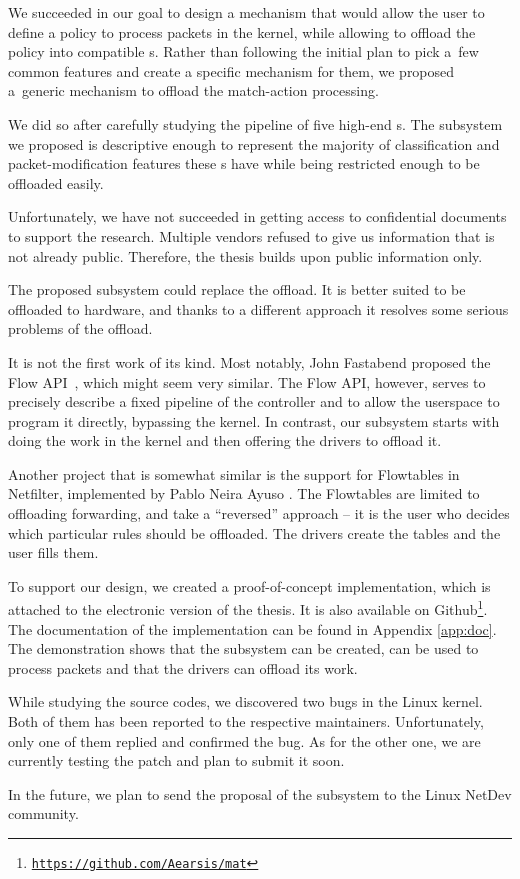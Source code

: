 
We succeeded in our goal to design a mechanism that would allow the user to
define a policy to process packets in the kernel, while allowing to offload the
policy into compatible s. Rather than following the initial plan to pick
a~few common features and create a specific mechanism for them, we
proposed a~generic mechanism to offload the match-action processing.

We did so after carefully studying the pipeline of five high-end s.
The subsystem we proposed is descriptive enough to represent the majority of
classification and packet-modification features these s have while
being restricted enough to be offloaded easily.

Unfortunately, we have not succeeded in getting access to confidential
documents to support the research. Multiple vendors refused to give us
information that is not already public. Therefore, the thesis builds upon
public information only.

The proposed subsystem could replace the  offload. It is better suited to be
offloaded to hardware, and thanks to a different approach it resolves some
serious problems of the  offload.

It is not the first work of its kind. Most notably, John Fastabend proposed
the Flow API~\cite{flow-api}, which might seem very similar. The
Flow API, however, serves to precisely describe a fixed pipeline of the
controller and to allow the userspace to program it directly, bypassing the
kernel. In contrast, our subsystem starts with doing the work in the kernel and
then offering the drivers to offload it.

Another project that is somewhat similar is the support for Flowtables in
Netfilter, implemented by Pablo Neira Ayuso \cite{flowtables}. The Flowtables
are limited to offloading forwarding, and take a ``reversed'' approach -- it is
the user who decides which particular rules should be offloaded. The drivers
create the tables and the user fills them.

To support our design, we created a proof-of-concept implementation, which
is attached to the electronic version of the thesis. It is also available
on Github\footnote{\href{https://github.com/Aearsis/mat}{\texttt{https://github.com/Aearsis/mat}}}.
The documentation of the implementation can be found in Appendix
\ref{app:doc}. The demonstration shows that the subsystem can be created, can
be used to process packets and that the drivers can offload its work.

While studying the source codes, we discovered two bugs in the Linux kernel.
Both of them has been reported to the respective maintainers. Unfortunately,
only one of them replied and confirmed the bug. As for the other one, we are
currently testing the patch and plan to submit it soon.

In the future, we plan to send the proposal of the subsystem to the Linux
NetDev community.
